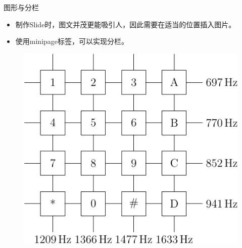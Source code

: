 \documentclass{beamer}
\begin{document}
\begin{frame}{图形与分栏}
    \begin{minipage}[c]{0.4\linewidth}
    	\begin{itemize}
    		\item 制作Slide时，图文并茂更能吸引人，因此需要在适当的位置插入图片。
    		\item 使用minipage标签，可以实现分栏。
    	\end{itemize}
    \end{minipage}
    \begin{minipage}{0.5\linewidth}
        \medskip
        \begin{figure}[h]
            \centering
            \includegraphics[height=.4\textheight]{pic/dtmf.pdf}
        \end{figure}
    \end{minipage}
\end{frame}
\end{document}
